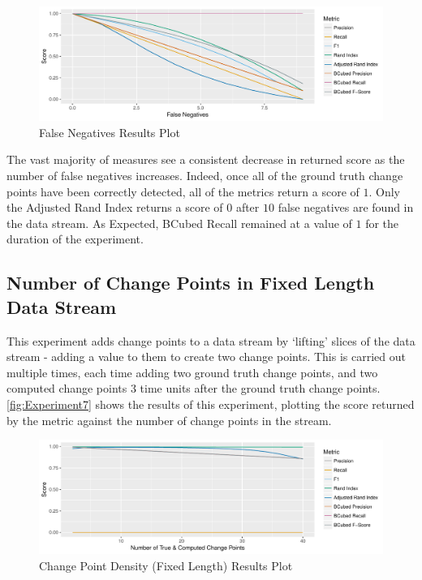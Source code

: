\documentclass{uvamscse}	%
\begin{document}
\begin{figure}[h]
    \includegraphics[width=\textwidth]{figures/Experiment6}
    \caption{False Negatives Results Plot}
    \label{fig:Experiment6}
\end{figure}

The vast majority of measures see a consistent decrease in returned score as the number of false negatives increases. Indeed, once all of the ground truth change points have been correctly detected, all of the metrics return a score of $1$. Only the Adjusted Rand Index returns a score of $0$ after $10$ false negatives are found in the data stream. As Expected, BCubed Recall remained at a value of $1$ for the duration of the experiment.

\subsection{Number of Change Points in Fixed Length Data Stream}

This experiment adds change points to a data stream by `lifting' slices of the data stream - adding a value to them to create two change points. This is carried out multiple times, each time adding two ground truth change points, and two computed change points 3 time units after the ground truth change points. \autoref{fig:Experiment7} shows the results of this experiment, plotting the score returned by the metric against the number of change points in the stream.

\begin{figure}[h]
    \includegraphics[width=\textwidth]{figures/Experiment8}
    \caption{Change Point Density (Fixed Length) Results Plot}
    \label{fig:Experiment7}
\end{figure}
\end{document}
